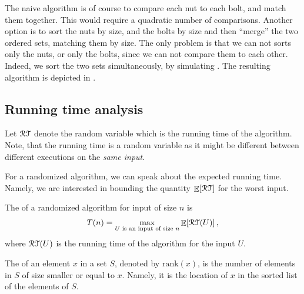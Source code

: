The naive algorithm is of course to compare each nut to each bolt, and
match them together. This would require a quadratic number of
comparisons. Another option is to sort the nuts by size, and the bolts
by size and then ``merge'' the two ordered sets, matching them by
size. The only problem is that we can not sorts only the nuts, or only
the bolts, since we can not compare them to each other. Indeed, we
sort the two sets simultaneously, by simulating \QuickSort{}. The
resulting algorithm is depicted in .

\subsection{Running time analysis}
\newcommand{\RunningTime}{\EuScript{RT}}

\begin{defn}
    Let $\RunningTime$ denote the random variable which is the running
    time of the algorithm. Note, that the running time is a random
    variable as it might be different between different executions on
    the \emph{same input}.
\end{defn}




\begin{defn}
    For a randomized algorithm, we can speak about the expected
    running time. Namely, we are interested in bounding the quantity
    $\Ex{\RunningTime}$  for the worst input.
\end{defn}

\begin{defn}
    The  of a
    randomized algorithm for input of size $n$ is 
    \begin{align*}
        T(n)=\max_{U \text{ is an input of size }n} \Ex{\MakeSBig
           \RunningTime(U)},
    \end{align*}
    where $\RunningTime(U)$ is the  running time of the
    algorithm for the input $U$.
\end{defn}

\newcommand{\Rank}{\mathrm{rank}}

\begin{defn}
    The  of an element $x$ in a set $S$, denoted by
    $\Rank(x)$, is the number of elements in $S$ of size smaller or
    equal to $x$. Namely, it is the location of $x$ in the sorted list
    of the elements of $S$.
\end{defn}

